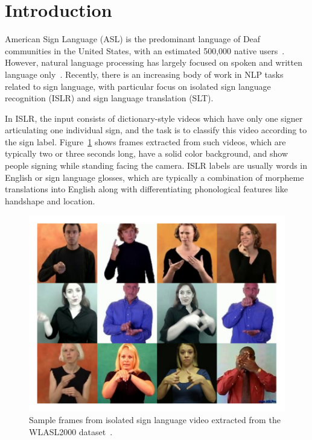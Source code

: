 \section{Introduction}
\label{sec:intro}

American Sign Language (ASL) is the predominant language of Deaf communities in the United States, with an estimated 500,000 native users~\cite{ethnologue}. However, natural language processing has largely focused on spoken and written language only~\cite{yin2021including}. Recently, there is an increasing body of work in NLP tasks related to sign language, with particular focus on isolated sign language recognition (ISLR) and sign language translation (SLT).

In ISLR, the input consists of dictionary-style videos which have only one signer articulating one individual sign, and the task is to classify this video according to the sign label. Figure~\ref{fig:wlasl-samples} shows frames extracted from such videos, which are typically two or three seconds long, have a solid color background, and show people signing while standing facing the camera. ISLR labels are usually words in English or sign language glosses, which are typically a combination of morpheme translations into English along with differentiating phonological features like handshape and location.

\begin{figure}
    \centering
    \includegraphics[width=\linewidth]{figures/wlasl-samples.pdf}
    \caption{Sample frames from isolated sign language video extracted from the WLASL2000 dataset~\cite{Li2020WLASL}.}
    \label{fig:wlasl-samples}
\end{figure}

